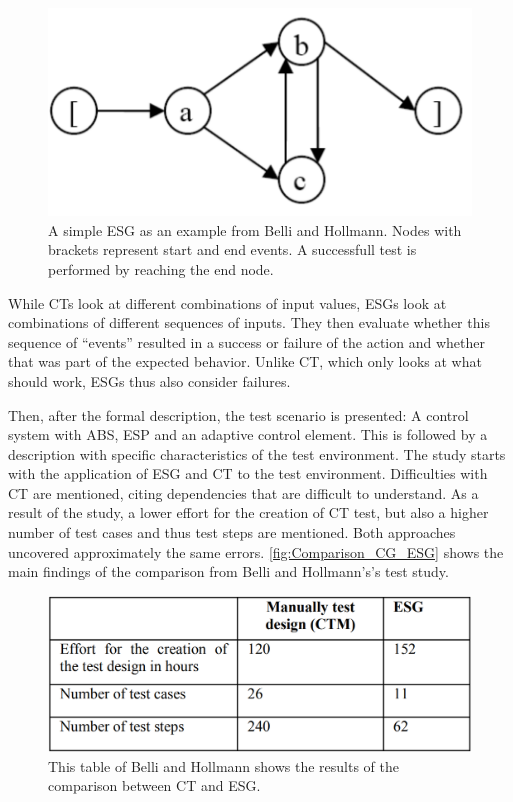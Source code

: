 \begin{figure}[H]
\centering
\includegraphics[scale=0.6]{../../individual/groeger/images/ESG_Beispiel.png} 
\caption{A simple ESG as an example from Belli and Hollmann. Nodes with brackets represent start and end events. A successfull test is performed by reaching the end node. \cite{Belli}}
\label{fig:Approach2_CT}
\end{figure}

While CTs look at different combinations of input values, ESGs look at combinations of different sequences of inputs. They then evaluate whether this sequence of \enquote{events} resulted in a success or failure of the action and whether that was part of the expected behavior. Unlike CT, which only looks at what should work, ESGs thus also consider failures.

Then, after the formal description, the test scenario is presented: A control system with ABS, ESP and an adaptive control element. This is followed by a description with specific characteristics of the test environment. The study starts with the application of ESG and CT to the test environment. Difficulties with CT are mentioned, citing dependencies that are difficult to understand. As a result of the study, a lower effort for the creation of CT test, but also a higher number of test cases and thus test steps are mentioned. Both approaches uncovered approximately the same errors. \autoref{fig:Comparison_CG_ESG} shows the main findings of the comparison from Belli and Hollmann's\cite{Belli}'s test study.

\begin{figure}[H]
\centering
\includegraphics[scale=0.4]{../../individual/groeger/images/Comparison_CG_ESG.png} 
\caption{This table of Belli and Hollmann\cite{Belli} shows the results of the comparison between CT and ESG.}
\label{fig:Comparison_CG_ESG}
\end{figure}


